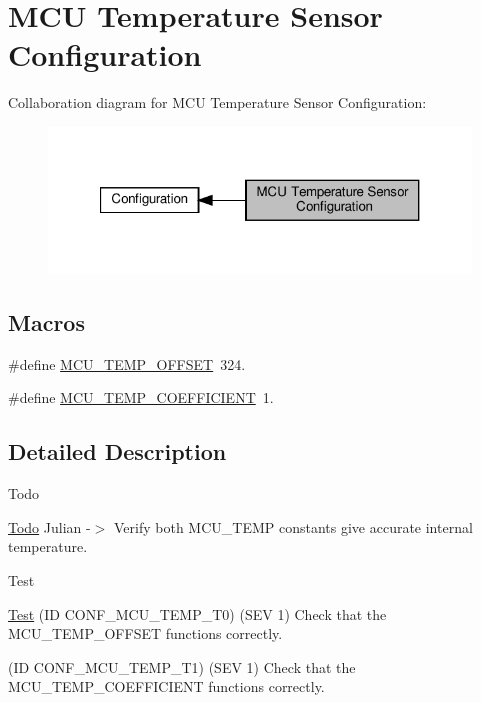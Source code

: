 \hypertarget{group__defines__mcu__temperature__configuration}{}\section{M\+CU Temperature Sensor Configuration}
\label{group__defines__mcu__temperature__configuration}
Collaboration diagram for M\+CU Temperature Sensor Configuration\+:
\nopagebreak
\begin{figure}[H]
\begin{center}
\leavevmode
\includegraphics[width=321pt]{group__defines__mcu__temperature__configuration}
\end{center}
\end{figure}
\subsection*{Macros}
\begin{DoxyCompactItemize}
\item 
\#define \hyperlink{group__defines__mcu__temperature__configuration_ga9c0099995bb74deac3678037a53abed3}{M\+C\+U\+\_\+\+T\+E\+M\+P\+\_\+\+O\+F\+F\+S\+ET}~324.
\item 
\#define \hyperlink{group__defines__mcu__temperature__configuration_ga4e9608050340ba03f9225c9037e73d6a}{M\+C\+U\+\_\+\+T\+E\+M\+P\+\_\+\+C\+O\+E\+F\+F\+I\+C\+I\+E\+NT}~1.
\end{DoxyCompactItemize}


\subsection{Detailed Description}
\begin{DoxyRefDesc}{Todo}
\item[\hyperlink{todo__todo000003}{Todo}]Julian -\/$>$ Verify both M\+C\+U\+\_\+\+T\+E\+MP constants give accurate internal temperature.\end{DoxyRefDesc}


\begin{DoxyRefDesc}{Test}
\item[\hyperlink{test__test000024}{Test}](ID C\+O\+N\+F\+\_\+\+M\+C\+U\+\_\+\+T\+E\+M\+P\+\_\+\+T0) (S\+EV 1) Check that the M\+C\+U\+\_\+\+T\+E\+M\+P\+\_\+\+O\+F\+F\+S\+ET functions correctly. 

(ID C\+O\+N\+F\+\_\+\+M\+C\+U\+\_\+\+T\+E\+M\+P\+\_\+\+T1) (S\+EV 1) Check that the M\+C\+U\+\_\+\+T\+E\+M\+P\+\_\+\+C\+O\+E\+F\+F\+I\+C\+I\+E\+NT functions correctly.\end{DoxyRefDesc}


